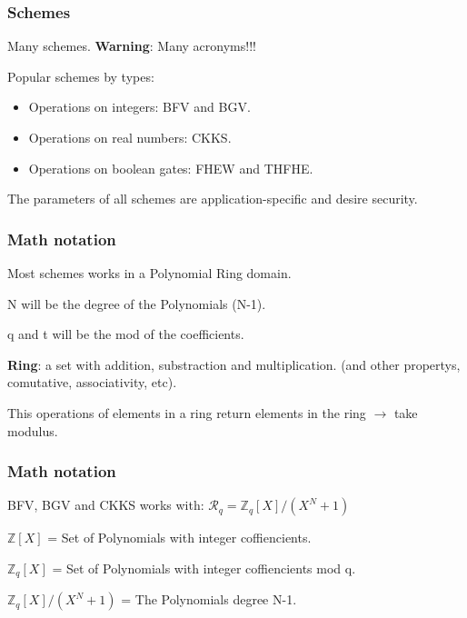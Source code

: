 \documentclass[10pt,handout]{beamer}
\begin{document}


\begin{frame}
    \frametitle{Schemes}

    Many schemes. \textbf{Warning}: Many acronyms!!!

    Popular schemes by types:
    \begin{itemize}
        \item Operations on integers: BFV and BGV.
        \item Operations on real numbers: CKKS.
        \item Operations on boolean gates: FHEW and THFHE.
    \end{itemize}


    The parameters of all schemes are application-specific and desire security.
\end{frame}



\begin{frame}
\frametitle{Math notation}
Most schemes works in a Polynomial Ring domain.

N will be the degree of the Polynomials (N-1).

q and t will be the mod of the coefficients.

\textbf{Ring}: a set with addition, substraction and multiplication. (and other propertys, comutative, associativity, etc).

This operations of elements in a ring return elements in the ring $\rightarrow$ take modulus.




\end{frame}



\begin{frame}
\frametitle{Math notation}
BFV, BGV and CKKS works with:    $\mathcal{R}_q =\mathbb{Z}_q[X]/(X^N+1)$

$\mathbb{Z}[X]$ = Set of Polynomials with integer coffiencients.

$\mathbb{Z}_q[X]$ = Set of Polynomials with integer coffiencients mod q.

$\mathbb{Z}_q[X]/(X^N+1)$ = The Polynomials degree N-1.


\end{frame}
\end{document}
